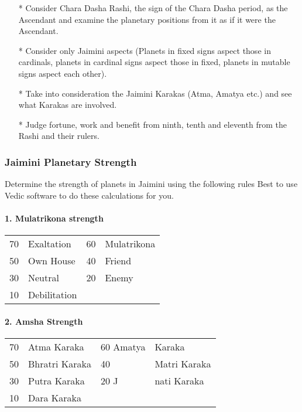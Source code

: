  

\begin{enumerate}
\item[*] Consider Chara Dasha Rashi, the sign of the Chara Dasha period, as the Ascendant and examine the planetary positions from it as if it were the Ascendant.
\item[*] Consider only Jaimini aspects (Planets in fixed signs aspect those in cardinals, planets in cardinal signs aspect those in fixed, planets in mutable signs aspect each other).
\item[*] Take into consideration the Jaimini Karakas (Atma, Amatya etc.) and see what Karakas are involved.
\item[*] Judge fortune, work and benefit from ninth, tenth and eleventh from the Rashi and their rulers.
 \end{enumerate}

\subsubsection{Jaimini Planetary Strength}
 

Determine the strength of planets in Jaimini using the following rules  Best to use Vedic software to do these calculations for you.

 

\paragraph{1.    Mulatrikona strength}

 
 
\begin{center}
\begin{tabular}{ l l l l}
70	&Exaltation	&60	&Mulatrikona             \\
50	&Own House	&40	&Friend             \\
30	&Neutral	&20	&Enemy             \\
10	&Debilitation	&&	             \\
  \end{tabular}
\end{center}

\paragraph{2. Amsha Strength}

 
 
\begin{center}
\begin{tabular}{ l l l l}
70	&Atma Karaka	&60	Amatya &Karaka             \\
50	&Bhratri Karaka	&40	&Matri Karaka             \\
30	&Putra Karaka	&20	J&nati Karaka             \\
10	&Dara Karaka		&&             \\
  \end{tabular}
\end{center}

